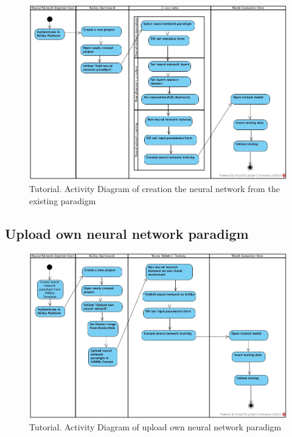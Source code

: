 \begin{figure}[htbp]
\begin{center}
  \includegraphics[width=\linewidth]{components/tutorial/img/tutorial_engeneer.jpg}
  \caption{Tutorial. Activity Diagram of creation the neural network from the existing paradigm}
  \label{fig:tutorial_engeneer}
\end{center}
\end{figure} 

\subsection{Upload own neural network paradigm}\label{Upload own neural network paradigm}


\begin{figure}[htbp]
\begin{center}
  \includegraphics[width=\linewidth]{components/tutorial/img/tutorial_contribut.jpg}
  \caption{Tutorial. Activity Diagram of upload own neural network paradigm}
  \label{fig:tutorial_contribut}
\end{center}
\end{figure} 
